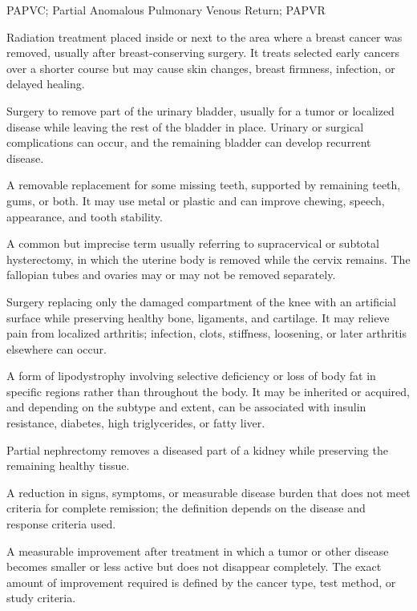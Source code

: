 \synonyms
PAPVC; Partial Anomalous Pulmonary Venous Return; PAPVR

 Radiation treatment placed inside or next to the area where a breast cancer was removed, usually after breast-conserving surgery. It treats selected early cancers over a shorter course but may cause skin changes, breast firmness, infection, or delayed healing.

 Surgery to remove part of the urinary bladder, usually for a tumor or localized disease while leaving the rest of the bladder in place. Urinary or surgical complications can occur, and the remaining bladder can develop recurrent disease.

 A removable replacement for some missing teeth, supported by remaining teeth, gums, or both. It may use metal or plastic and can improve chewing, speech, appearance, and tooth stability.

 A common but imprecise term usually referring to supracervical or subtotal hysterectomy, in which the uterine body is removed while the cervix remains. The fallopian tubes and ovaries may or may not be removed separately.

 Surgery replacing only the damaged compartment of the knee with an artificial surface while preserving healthy bone, ligaments, and cartilage. It may relieve pain from localized arthritis; infection, clots, stiffness, loosening, or later arthritis elsewhere can occur.

 A form of lipodystrophy involving selective deficiency or loss of body fat in specific regions rather than throughout the body. It may be inherited or acquired, and depending on the subtype and extent, can be associated with insulin resistance, diabetes, high triglycerides, or fatty liver.

 Partial nephrectomy removes a diseased part of a kidney while preserving the remaining healthy tissue.

 A reduction in signs, symptoms, or measurable disease burden that does not meet criteria for complete remission; the definition depends on the disease and response criteria used.

 A measurable improvement after treatment in which a tumor or other disease becomes smaller or less active but does not disappear completely. The exact amount of improvement required is defined by the cancer type, test method, or study criteria.

